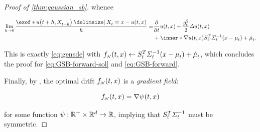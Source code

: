 \begin{proof}[Proof of \cref{thm:gaussian_sb}]
whence 

\begin{align}
\nn
\lim_{ h\to 0}  \frac{  \exof*{ \testf[\ctime+h][\Xsol[\ctime+h]] \given \Xsol = x }  - \testf  }{h} = &\frac{\del}{\del \ctime} \testf +  \frac{\volatsq[\ctime]}{2} \Laplace \testf \\
 &+  \inner*{  \nabla \testf }{ \St^T  \Sigmasolinv\parens*{ \point - \meansol  } + \dmeansol  }.
\end{align}

This is exactly \eqref{eq:gensde} with $\GSBf \subs \St^T  \Sigmasolinv\parens*{ \point - \meansol  } + \dmeansol$, which concludes the proof for \eqref{eq:GSB-forward-sol} and \eqref{eq:GSB-forward}.

Finally, by \citet[(4.2)]{leonard2013survey}, the optimal drift $\GSBf$ is a \emph{gradient field}: 

\begin{equation}
\GSBf = \nabla \psi(\ctime,\point)
\end{equation}

for some function $\psi: \mathbb{R}^+ \times \mathbb{R}^d \to \mathbb{R}$, implying that $S_{t}^T \Sigma^{-1}_{ t }$ must be symmetric.
\end{proof}
